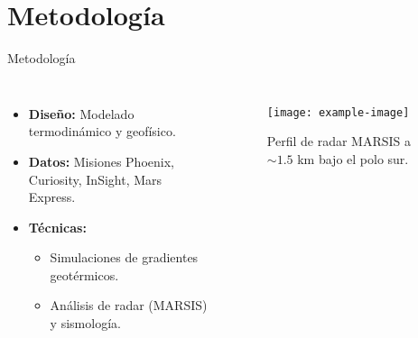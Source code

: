 \documentclass{beamer}
\begin{document}
\section{Metodología}
\begin{frame}{Metodología}
  \begin{columns}
      \begin{itemize}
        \item \textbf{Diseño:} Modelado termodinámico y geofísico.
        \item \textbf{Datos:} Misiones Phoenix, Curiosity, InSight, Mars Express.
        \item \textbf{Técnicas:}
          \begin{itemize}
            \item Simulaciones de gradientes geotérmicos.
            \item Análisis de radar (MARSIS) y sismología.
          \end{itemize}
      \end{itemize}
      \begin{figure}
        \centering
        \texttt{[image: example-image]}
        \caption{Perfil de radar MARSIS a $\sim 1.5$ km bajo el polo sur. \cite{orosei2018}}
      \end{figure}
  \end{columns}
\end{frame}

\end{document}
